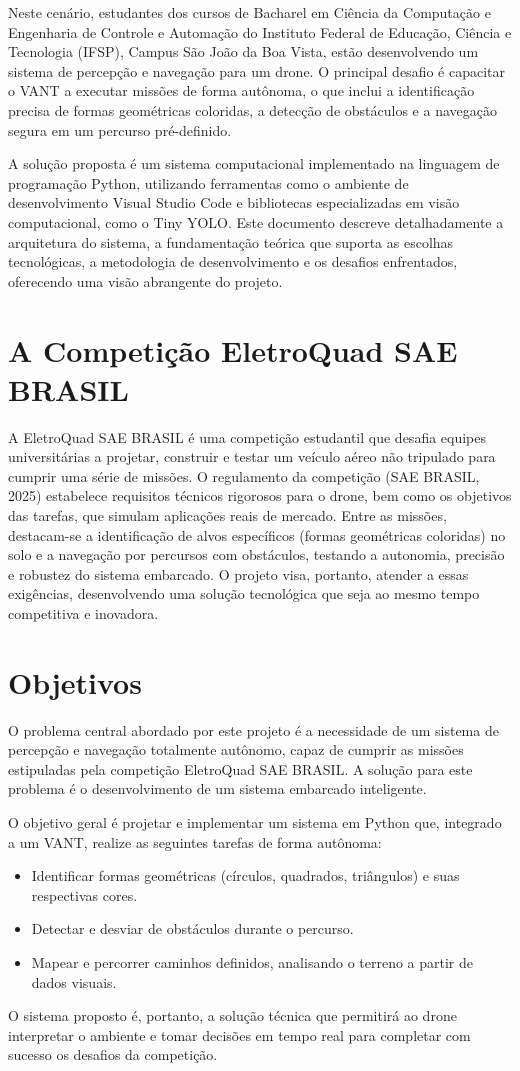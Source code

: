 \documentclass{SBCbookchapter}
\begin{document}
Neste cenário, estudantes dos cursos de Bacharel em Ciência da Computação e Engenharia de Controle e Automação do Instituto Federal de Educação, Ciência e Tecnologia (IFSP), Campus São João da Boa Vista, estão desenvolvendo um sistema de percepção e navegação para um drone. O principal desafio é capacitar o VANT a executar missões de forma autônoma, o que inclui a identificação precisa de formas geométricas coloridas, a detecção de obstáculos e a navegação segura em um percurso pré-definido.

A solução proposta é um sistema computacional implementado na linguagem de programação Python, utilizando ferramentas como o ambiente de desenvolvimento Visual Studio Code e bibliotecas especializadas em visão computacional, como o Tiny YOLO. Este documento descreve detalhadamente a arquitetura do sistema, a fundamentação teórica que suporta as escolhas tecnológicas, a metodologia de desenvolvimento e os desafios enfrentados, oferecendo uma visão abrangente do projeto.

\section{A Competição EletroQuad SAE BRASIL}
A EletroQuad SAE BRASIL é uma competição estudantil que desafia equipes universitárias a projetar, construir e testar um veículo aéreo não tripulado para cumprir uma série de missões. O regulamento da competição (SAE BRASIL, 2025) estabelece requisitos técnicos rigorosos para o drone, bem como os objetivos das tarefas, que simulam aplicações reais de mercado. Entre as missões, destacam-se a identificação de alvos específicos (formas geométricas coloridas) no solo e a navegação por percursos com obstáculos, testando a autonomia, precisão e robustez do sistema embarcado. O projeto visa, portanto, atender a essas exigências, desenvolvendo uma solução tecnológica que seja ao mesmo tempo competitiva e inovadora.

\section{Objetivos}
O problema central abordado por este projeto é a necessidade de um sistema de percepção e navegação totalmente autônomo, capaz de cumprir as missões estipuladas pela competição EletroQuad SAE BRASIL. A solução para este problema é o desenvolvimento de um sistema embarcado inteligente.

O objetivo geral é projetar e implementar um sistema em Python que, integrado a um VANT, realize as seguintes tarefas de forma autônoma:
\begin{itemize}
    \item Identificar formas geométricas (círculos, quadrados, triângulos) e suas respectivas cores.
    \item Detectar e desviar de obstáculos durante o percurso.
    \item Mapear e percorrer caminhos definidos, analisando o terreno a partir de dados visuais.
\end{itemize}
O sistema proposto é, portanto, a solução técnica que permitirá ao drone interpretar o ambiente e tomar decisões em tempo real para completar com sucesso os desafios da competição.
\end{document}

